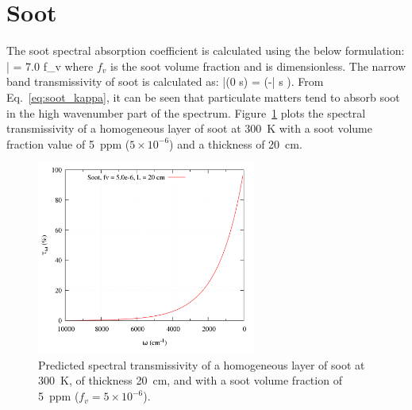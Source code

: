 \section{Soot}

The soot spectral absorption coefficient is calculated using the below formulation:
\be\label{eq:soot_kappa}
\bar{\kappa} = 7.0 \om f_v
\ee
where $f_v$ is the soot volume fraction and is dimensionless. The narrow band transmissivity of soot is calculated as:
\be\label{eq::soot_optical_depth}
\bar{\tau}(0 \rightarrow s) = \exp\left(-\bar{\kappa} s \right).
\ee
From Eq.~\ref{eq:soot_kappa}, it can be seen that particulate matters tend to absorb soot in the high wavenumber part of the spectrum. Figure~\ref{fig:SOOT_300K} plots the spectral transmissivity of a homogeneous layer of soot at 300~K with a soot volume fraction value of 5~ppm ($5\times 10^{-6}$) and a thickness of 20~cm.

\begin{figure}[ht]
\begin{center}
 \includegraphics[height=2.5in]{Figures/SOOT_300K.png}
\end{center}
\caption{Predicted spectral transmissivity of a homogeneous layer of soot at 300~K, of thickness 20~cm, and with a soot volume fraction of 5~ppm ($f_v = 5\times 10^{-6}$).\label{fig:SOOT_300K}}
\end{figure}
